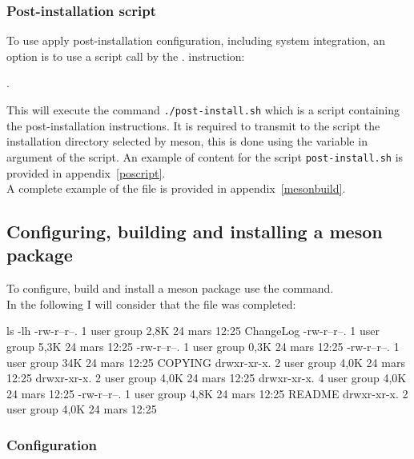 \subsubsection*{Post-installation script}

To use apply post-installation configuration, including system integration, an option is to use a
script call by the . instruction:
\begin{script}
.
\end{script}
This will execute the command \texttt{./post-install.sh} which is a script containing the post-installation instructions. 
It is required to transmit to the script the installation directory selected by meson, this is done using the variable  in argument of the script. 
An example of content for the script \texttt{post-install.sh} is provided in appendix~\ref{poscript}. \\[0.25cm]
A complete example of the file  is provided in appendix~\ref{mesonbuild}.

\subsection{Configuring, building and installing a meson package}

To configure, build and install a meson package use the  command. \\
In the following I will consider that the file  was completed: 
{\footnotesize{
\begin{script}
 ls -lh
-rw-r--r--. 1 user group 2,8K 24 mars  12:25 ChangeLog
-rw-r--r--. 1 user group 5,3K 24 mars  12:25 
-rw-r--r--. 1 user group 0,3K 24 mars  12:25  
-rw-r--r--. 1 user group  34K 24 mars  12:25 COPYING
drwxr-xr-x. 2 user group 4,0K 24 mars  12:25 
drwxr-xr-x. 2 user group 4,0K 24 mars  12:25 
drwxr-xr-x. 4 user group 4,0K 24 mars  12:25 
-rw-r--r--. 1 user group 4,8K 24 mars  12:25 README
drwxr-xr-x. 2 user group 4,0K 24 mars  12:25 
\end{script}
}}

\subsubsection*{Configuration}
\label{mesonconfigure}

